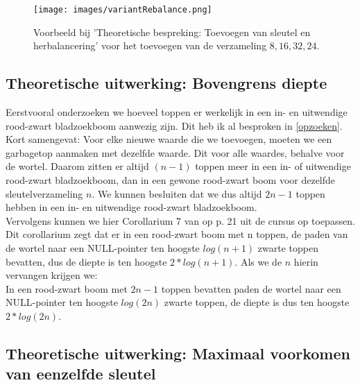 \documentclass[11pt,a4paper]{report}
\begin{document}
\begin{figure}[h!]
	\centering
		\texttt{[image: images/variantRebalance.png]}
	\caption{Voorbeeld bij 'Theoretische bespreking: Toevoegen van sleutel en herbalancering' voor het toevoegen van de verzameling ${8, 16, 32, 24}$.}
	\label{variantRebalance}
\end{figure}

\subsection{Theoretische uitwerking: Bovengrens diepte}
\label{theorem: bovengrens diepte}
Eerstvooral onderzoeken we hoeveel toppen er werkelijk in een in- en uitwendige rood-zwart bladzoekboom aanwezig zijn. Dit heb ik al besproken in \ref{opzoeken}. Kort samengevat: Voor elke nieuwe waarde die we toevoegen, moeten we een garbagetop aanmaken met dezelfde waarde. Dit voor alle waardes, behalve voor de wortel. Daarom zitten er altijd $(n-1)$ toppen meer in een in- of uitwendige rood-zwart bladzoekboom, dan in een gewone rood-zwart boom voor dezelfde sleutelverzameling $n$. We kunnen besluiten dat we dus altijd $2n-1$ toppen hebben in een in- en uitwendige rood-zwart bladzoekboom.\\
Vervolgens kunnen we hier Corollarium 7 van op p. 21 uit de cursus op toepassen. Dit corollarium zegt dat er in een rood-zwart boom met n toppen, de paden van de wortel naar een NULL-pointer ten hoogste $log(n+1)$ zwarte toppen bevatten, dus de diepte is ten hoogste $2*log(n+1)$. Als we de $n$ hierin vervangen krijgen we:\\
In een rood-zwart boom met $2n-1$ toppen bevatten paden de wortel naar een NULL-pointer ten hoogste $log(2n)$ zwarte toppen, de diepte is dus ten hoogste $2*log(2n)$.

\subsection{Theoretische uitwerking: Maximaal voorkomen van eenzelfde sleutel}
\end{document}
